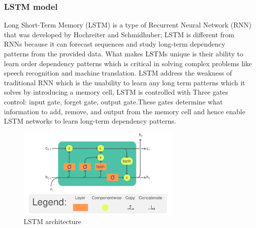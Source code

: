 \subsubsection{LSTM model}
Long Short-Term Memory (LSTM) is a type of Recurrent Neural Network (RNN) that was developed by Hochreiter and Schmidhuber; LSTM is different from RNNs because it can forecast sequences and study long-term dependency patterns from the provided data. What makes LSTMs unique is their ability to learn order dependency patterns which is critical in solving complex problems like speech recognition and machine translation.
LSTM address the weakness of traditional RNN which is the unability to learn any long term patterns which it solves by introducing a memory cell, LSTM is controlled with Three gates control: input gate, forget gate, output gate.These gates determine what information to add, remove, and output from the memory cell and hence enable LSTM networks to learn long-term dependency patterns. \cite{lstm}


\begin{figure}[h]
	\centering
	\includegraphics[width=300px]{figures/LSTM_Cell_edited.png}
	\caption{LSTM architecture \cite{LSTM-architecture}}
	\label{fig:LSTM-test}
\end{figure}










